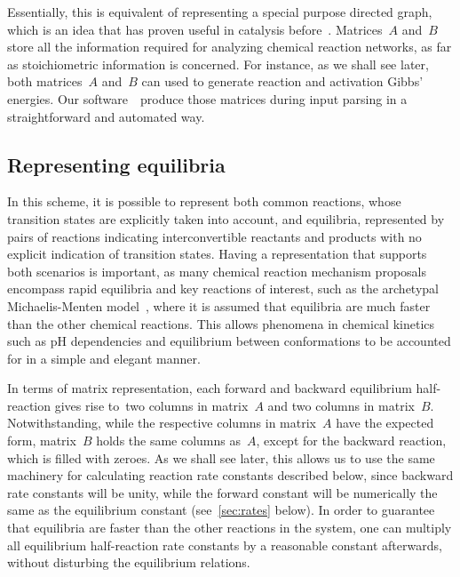 Essentially,
this is equivalent of representing a special purpose directed graph,
which is an idea that has proven useful in catalysis before~\cite{Kozuch_2006,Kozuch_2015,Solel_2019}.
Matrices~$A$ and~$B$ store all the information required
for analyzing chemical reaction networks,
as far as stoichiometric information is concerned.
For instance,
as we shall see later,
both matrices~$A$ and~$B$ can used to generate reaction and activation Gibbs' energies.
Our software~\overreact{}~produce those matrices during input parsing in a straightforward and automated way.

\subsection{Representing equilibria}%
\label{sec:kin-repr-equi}

In this scheme,
it is possible to represent both common reactions,
whose transition states are explicitly taken into account,
and equilibria,
represented by pairs of reactions indicating interconvertible reactants and products with no explicit indication of transition states.
Having a representation that supports both scenarios is important,
as many chemical reaction mechanism proposals encompass rapid equilibria and key reactions of interest,
such as the archetypal Michaelis-Menten model~\cite{Michaelis_1913,Johnson_2011,Srinivasan_2020,Srinivasan_2021},
where it is assumed that equilibria are much faster than the other chemical reactions.
This allows phenomena in chemical kinetics such as pH dependencies and equilibrium between conformations to be accounted for in a simple and elegant manner.

In terms of matrix representation,
each forward and backward equilibrium half-reaction gives rise to~two columns in matrix~$A$ and two columns in matrix~$B$.
Notwithstanding,
while the respective columns in matrix~$A$ have the expected form,
matrix~$B$ holds the same columns as~$A$,
except for the backward reaction,
which is filled with zeroes.
As we shall see later,
this allows us to use the same machinery for calculating reaction rate constants described below,
since backward rate constants will be unity,
while the forward constant will be numerically the same as the equilibrium constant (see~\cref{sec:rates} below).
In order to guarantee that equilibria are faster than the other reactions in the system,
one can multiply all equilibrium half-reaction rate constants by a reasonable constant afterwards,
without disturbing the equilibrium relations.

